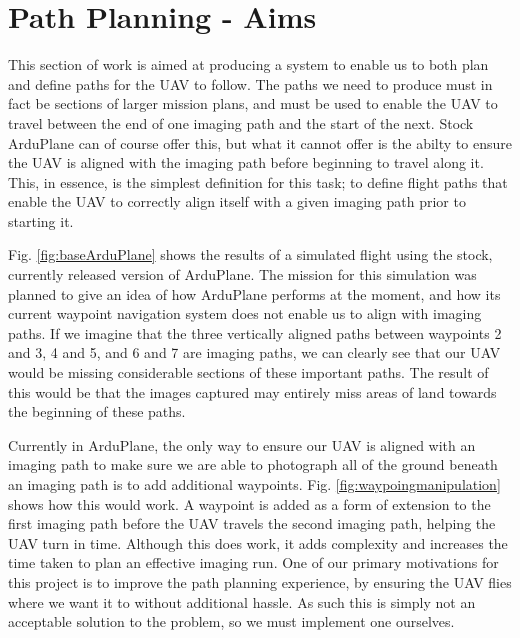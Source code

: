 \section{Path Planning - Aims}
\label{task1:aims}

This section of work is aimed at producing a system to enable us to both plan and define paths for the UAV to follow. The paths we need to produce must in fact be sections of larger mission plans, and must be used to enable the UAV to travel between the end of one imaging path and the start of the next. Stock ArduPlane can of course offer this, but what it cannot offer is the abilty to ensure the UAV is aligned with the imaging path before beginning to travel along it. This, in essence, is the simplest definition for this task; to define flight paths that enable the UAV to correctly align itself with a given imaging path prior to starting it.  

Fig. \ref{fig:baseArduPlane} shows the results of a simulated flight using the stock, currently released version of ArduPlane. The mission for this simulation was planned to give an idea of how ArduPlane performs at the moment, and how its current waypoint navigation system does not enable us to align with imaging paths. If we imagine that the three vertically aligned paths between waypoints 2 and 3, 4 and 5, and 6 and 7 are imaging paths, we can clearly see that our UAV would be missing considerable sections of these important paths. The result of this would be that the images captured may entirely miss areas of land towards the beginning of these paths. 

Currently in ArduPlane, the only way to ensure our UAV is aligned with an imaging path to make sure we are able to photograph all of the ground beneath an imaging path is to add additional waypoints. Fig. \ref{fig:waypoingmanipulation} shows how this would work. A waypoint is added as a form of extension to the first imaging path before the UAV travels the second imaging path, helping the UAV turn in time. Although this does work, it adds complexity and increases the time taken to plan an effective imaging run. One of our primary motivations for this project is to improve the path planning experience, by ensuring the UAV flies where we want it to without additional hassle. As such this is simply not an acceptable solution to the problem, so we must implement one ourselves.

